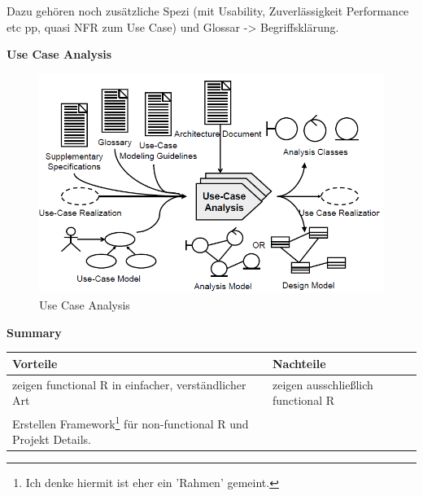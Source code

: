 Dazu gehören noch zusätzliche Spezi (mit Usability, Zuverlässigkeit Performance etc pp, quasi NFR zum Use Case) und Glossar -> Begriffsklärung. 

\newpage
\textbf{Use Case Analysis}
\begin{figure}[!h]
	\centering
	\includegraphics[scale=0.4]{img/use_case_analysis.png}
	\caption{Use Case Analysis}
\end{figure}

\textbf{Summary}\\
\begin{table}[!h]
	\begin{tabular}{p{20em}|p{20em}}
		Vorteile & Nachteile\\
		\hline
		zeigen functional R in einfacher, verständlicher Art & zeigen ausschließlich functional R\\
		Erstellen Framework\footnote{Ich denke hiermit ist eher ein 'Rahmen' gemeint.} für non-functional R und Projekt Details. & 
	\end{tabular}
\end{table}

